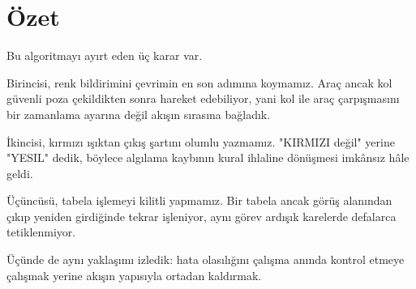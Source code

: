 \documentclass[11pt,a4paper]{article}
\begin{document}
\section{Özet}

Bu algoritmayı ayırt eden üç karar var.

Birincisi, renk bildirimini çevrimin en son adımına koymamız. Araç ancak kol
güvenli poza çekildikten sonra hareket edebiliyor, yani kol ile araç
çarpışmasını bir zamanlama ayarına değil akışın sırasına bağladık.

İkincisi, kırmızı ışıktan çıkış şartını olumlu yazmamız. "KIRMIZI değil" yerine
"YESIL" dedik, böylece algılama kaybının kural ihlaline dönüşmesi imkânsız hâle
geldi.

Üçüncüsü, tabela işlemeyi kilitli yapmamız. Bir tabela ancak görüş alanından
çıkıp yeniden girdiğinde tekrar işleniyor, aynı görev ardışık karelerde
defalarca tetiklenmiyor.

Üçünde de aynı yaklaşımı izledik: hata olasılığını çalışma anında kontrol
etmeye çalışmak yerine akışın yapısıyla ortadan kaldırmak.
\end{document}
